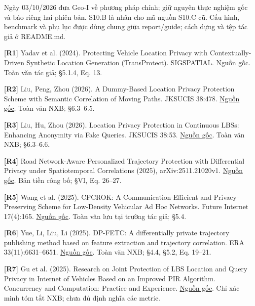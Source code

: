 \documentclass[10pt,a4paper]{article}
\begin{document}
Ngày 03/10/2026 đưa Geo-I về phương pháp chính; giữ nguyên thực nghiệm gốc và báo riêng hai phiên bản. S10.B là nhãn cho mã nguồn S10.C cũ. Cấu hình, benchmark và phụ lục được dùng chung giữa report/guide; cách dựng và tệp tác giả ở README.md.

\par\hypertarget{ref-R1}{}\textbf{[R1]} Yadav et al. (2024). Protecting Vehicle Location Privacy with Contextually-Driven Synthetic Location Generation (TransProtect). SIGSPATIAL. \href{https://arxiv.org/html/2409.09495v1}{Nguồn gốc}. Toàn văn tác giả; §5.1.4, Eq. 13.
\par\hypertarget{ref-R2}{}\textbf{[R2]} Liu, Peng, Zhou (2026). A Dummy-Based Location Privacy Protection Scheme with Semantic Correlation of Moving Paths. JKSUCIS 38:478. \href{https://link.springer.com/article/10.1007/s44443-026-00899-w}{Nguồn gốc}. Toàn văn NXB; §6.3–6.5.
\par\hypertarget{ref-R3}{}\textbf{[R3]} Liu, Hu, Zhou (2026). Location Privacy Protection in Continuous LBSs: Enhancing Anonymity via Fake Queries. JKSUCIS 38:53. \href{https://link.springer.com/article/10.1007/s44443-025-00438-z}{Nguồn gốc}. Toàn văn NXB; §6.3–6.6.
\par\hypertarget{ref-R4}{}\textbf{[R4]} Road Network-Aware Personalized Trajectory Protection with Differential Privacy under Spatiotemporal Correlations (2025), arXiv:2511.21020v1. \href{https://arxiv.org/html/2511.21020v1}{Nguồn gốc}. Bản tiền công bố; §VI, Eq. 26–27.
\par\hypertarget{ref-R5}{}\textbf{[R5]} Wang et al. (2025). CPCROK: A Communication-Efficient and Privacy-Preserving Scheme for Low-Density Vehicular Ad Hoc Networks. Future Internet 17(4):165. \href{https://uhra.herts.ac.uk/id/eprint/25705/1/futureinternet-17-00165.pdf}{Nguồn gốc}. Toàn văn lưu tại trường tác giả; §5.4.
\par\hypertarget{ref-R6}{}\textbf{[R6]} Yue, Li, Liu, Li (2025). DP-FETC: A differentially private trajectory publishing method based on feature extraction and trajectory correlation. ERA 33(11):6631–6651. \href{https://www.aimspress.com/aimspress-data/era/2025/11/PDF/era-33-11-293.pdf}{Nguồn gốc}. Toàn văn NXB; §4.4, §5.2, Eq. 19–21.
\par\hypertarget{ref-R7}{}\textbf{[R7]} Gu et al. (2025). Research on Joint Protection of LBS Location and Query Privacy in Internet of Vehicles Based on an Improved PIR Algorithm. Concurrency and Computation: Practice and Experience. \href{https://onlinelibrary.wiley.com/doi/abs/10.1002/cpe.70447}{Nguồn gốc}. Chỉ xác minh tóm tắt NXB; chưa đủ định nghĩa các metric.
\end{document}

